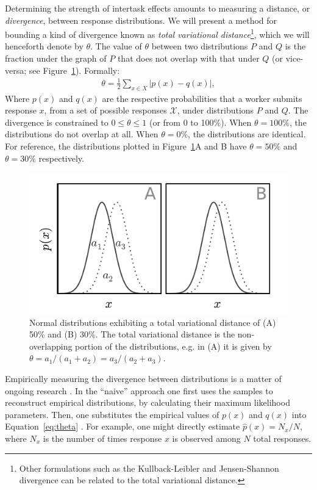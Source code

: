 \documentclass{sigchi}
\begin{document}
Determining the strength of intertask effects amounts to measuring a 
distance, or \textit{divergence}, between response distributions.
We will present a method for bounding a kind of divergence known as 
\textit{total variational distance}\footnote{
  Other formulations such as the Kullback-Leibler and 
  Jensen-Shannon divergence can be related to the total variational
  distance.
}, which we will henceforth denote by $\theta$.
The value of $\theta$ between two distributions $P$ and $Q$ 
is the fraction under the graph of $P$ that does not overlap with that
under $Q$ (or vice-versa; see Figure~\ref{fig:l1_example}).  
Formally:
\begin{align}
	\theta = \frac{1}{2}\sum_{x \in X} \left| p(x) - q(x) \right|,
	\label{eq:theta}
\end{align}
Where $p(x)$ and $q(x)$ are the respective probabilities 
that a worker submits response $x$, from a set of possible responses 
$\mathcal{X}$, under distributions $P$ and $Q$.
The divergence is constrained to 
$0 \leq \theta \leq 1$ (or from 0 to 100\%).
When $\theta = 100\%$, the distributions do not overlap at all.  
When $\theta = 0\%$, the distributions are identical.
For reference, the distributions plotted in 
Figure~\ref{fig:l1_example}A and B have $\theta=50\%$ and $\theta=30\%$ 
respectively.

\begin{figure}
	\centering
	\includegraphics[scale=1.0]{figs/normal_example.pdf}
	\caption{
	  	Normal distributions exhibiting a total variational distance
		of (A) 50\% and (B) 30\%.  The total variational distance is 
		the non-overlapping portion of the distributions, e.g. in
		(A) it is given by 
		$\theta = a_1 / (a_1 + a_2) = a_3 / (a_2 + a_3)$.
	}
	\label{fig:l1_example}
\end{figure}

Empirically measuring the divergence between distributions
is a matter of ongoing
research \cite{val-thesis,batu2013testing,chan2014optimal}.
In the ``naive'' approach one first uses the samples to reconstruct 
empirical
distributions, by calculating their maximum likelihood parameters.
Then, one substitutes the empirical values of $p(x)$ and $q(x)$ into 
Equation~\ref{eq:theta} \cite{batu2013testing}.  
For example, one might directly estimate $\hat{p}(x) = N_x/N$, 
where $N_x$ is the number of times response $x$ is observed among $N$ 
total responses.
\end{document}
